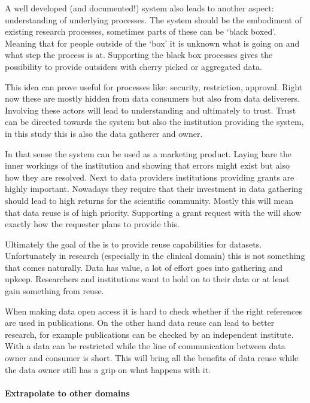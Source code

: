 A well developed (and documented!) system also leads to another aspect: understanding of underlying processes.
The system should be the embodiment of existing research processes, sometimes parts of these can be `black boxed'.
Meaning that for people outside of the `box' it is unknown what is going on and what step the process is at.
Supporting the black box processes gives the possibility to provide outsiders with cherry picked or aggregated data.

This idea can prove useful for processes like: security, restriction, approval.
Right now these are mostly hidden from data consumers but also from data deliverers.
Involving these actors will lead to understanding and ultimately to trust.
Trust can be directed towards the system but also the institution providing the system, in this study this is also the data gatherer and owner.

In that sense the system can be used as a marketing product.
Laying bare the inner workings of the institution and showing that errors might exist but also how they are resolved.
Next to data providers institutions providing grants are highly important.
Nowadays they require that their investment in data gathering should lead to high returns for the scientific community.
Mostly this will mean that data reuse is of high priority. 
Supporting a grant request with the \ivfsystem{} will show exactly how the requester plans to provide this.

Ultimately the goal of the \ivfsystem{} is to provide reuse capabilities for datasets.
Unfortunately in research (especially in the clinical domain) this is not something that comes naturally.
Data has value, a lot of effort goes into gathering and upkeep.
Researchers and institutions want to hold on to their data or at least gain something from reuse.

When making data open access it is hard to check whether if the right references are used in publications.
On the other hand data reuse can lead to better research, for example publications can be checked by an independent institute.
With a \ivfsystem{} data can be restricted while the line of communication between data owner and consumer is short.
This will bring all the benefits of data reuse while the data owner still has a grip on what happens with it.

\paragraph{Extrapolate to other domains}

